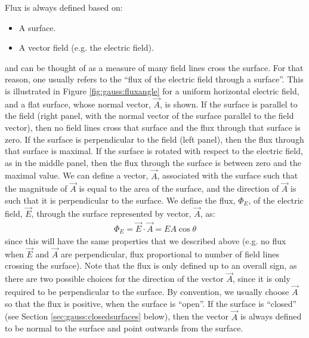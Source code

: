 Flux is always defined based on:
\begin{itemize}
\item A surface.
\item A vector field (e.g. the electric field). 
\end{itemize}
and can be thought of as a measure of many field lines cross the surface. For that reason, one usually refers to the ``flux of the electric field through a surface''. This is illustrated in Figure \ref{fig:gauss:fluxangle} for a uniform horizontal electric field, and a flat surface, whose normal vector, $\vec A$, is shown. If the surface is parallel to the field (right panel, with the normal vector of the surface parallel to the field vector), then no field lines cross that surface and the flux through that surface is zero. If the surface is perpendicular to the field (left panel), then the flux through that surface is maximal. If the surface is rotated with respect to the electric field, as in the middle panel, then the flux through the surface is between zero and the maximal value.
We can define a vector, $\vec A$, associated with the surface such that the magnitude of $\vec A$ is equal to the area of the surface, and the direction of $\vec A$ is such that it is perpendicular to the surface. We define the flux, $\Phi_E$, of the electric field, $\vec E$, through the surface represented by vector, $\vec A$, as:
\begin{align*}
\Phi_E=\vec E\cdot \vec A=EA\cos\theta
\end{align*}
since this will have the same properties that we described above (e.g. no flux when $\vec E$ and $\vec A$ are perpendicular, flux proportional to number of field lines crossing the surface). Note that the flux is only defined up to an overall sign, as there are two possible choices for the direction of the vector $\vec A$, since it is only required to be perpendicular to the surface. By convention, we usually choose $\vec A$ so that the flux is positive, when the surface is ``open''. If the surface is ``closed'' (see Section \ref{sec:gauss:closedsurfaces} below), then the vector $\vec A$ is always defined to be normal to the surface and point outwards from the surface.

